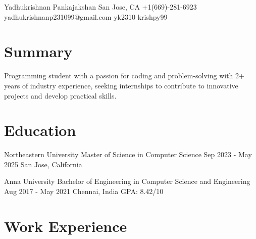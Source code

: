 \documentclass[letterpaper]{resume_config}
\begin{document}
\Header
    {Yadhukrishnan Pankajakshan} %
    {San Jose, CA} %
    {+1(669)-281-6923} %
    {yadhukrishnanp231099@gmail.com} %
    {yk2310} %
    {krishpy99}

\section{Summary}
{
    Programming student with a passion for coding and problem-solving with 2+ years of industry experience, seeking internships to contribute to innovative projects and develop practical skills.
}

\section{Education}

\EducationExperience
    {Northeastern University} %
    {Master of Science in Computer Science} %
    {Sep 2023 - May 2025} %
    {San Jose, California} %
    {}

\EducationExperience
    {Anna University} %
    {Bachelor of Engineering in Computer Science and Engineering} %
    {Aug 2017 - May 2021} %
    {Chennai, India} %
    {GPA: 8.42/10}
\vspace{-7pt}


\section{Work Experience}
\end{document}
